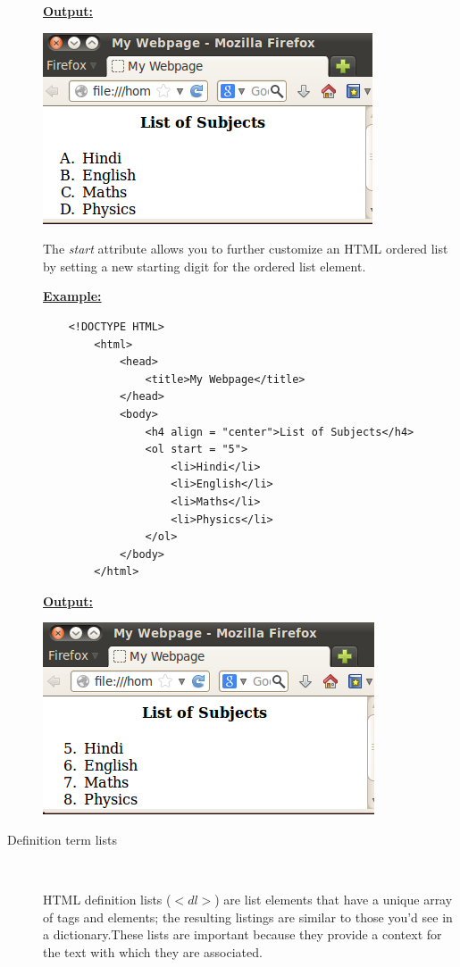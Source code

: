 \documentclass[11pt,a4paper]{article}
\begin{document}
\begin{description}
\underline{\textbf{Output:}}

\includegraphics[scale=0.56]{OL4.png}\


The \emph{start} attribute allows you to further customize an HTML ordered list by setting a new starting digit for the ordered list element.

\underline{\textbf{Example:}}
\begin{verbatim}
    <!DOCTYPE HTML>
        <html>
            <head>
                <title>My Webpage</title>
            </head>
            <body>
                <h4 align = "center">List of Subjects</h4>
                <ol start = "5">
                    <li>Hindi</li>
                    <li>English</li>
                    <li>Maths</li>
                    <li>Physics</li>
                </ol>
            </body>
        </html>
\end{verbatim}

\underline{\textbf{Output:}}\

\includegraphics[scale=0.7]{Start.png}\\

\item[Definition term lists]\

HTML definition lists ($<dl>$) are list elements that have a unique array of tags and elements; the resulting listings are similar to those you'd see in a dictionary.These lists are important because they provide a context for the text with which they are associated.\


\end{description}
\end{document}
